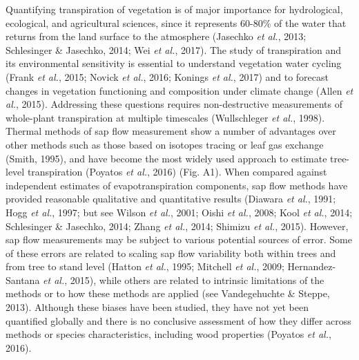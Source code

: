 \documentclass[11pt,twoside]{reedthesis}
\begin{document}
Quantifying transpiration of vegetation is of major importance for
hydrological, ecological, and agricultural sciences, since it represents
60-80\% of the water that returns from the land surface to the
atmosphere (Jasechko \emph{et al.}, 2013; Schlesinger \& Jasechko, 2014;
Wei \emph{et al.}, 2017). The study of transpiration and its
environmental sensitivity is essential to understand vegetation water
cycling (Frank \emph{et al.}, 2015; Novick \emph{et al.}, 2016; Konings
\emph{et al.}, 2017) and to forecast changes in vegetation functioning
and composition under climate change (Allen \emph{et al.}, 2015).
Addressing these questions requires non-destructive measurements of
whole-plant transpiration at multiple timescales (Wullschleger \emph{et
al.}, 1998). Thermal methods of sap flow measurement show a number of
advantages over other methods such as those based on isotopes tracing or
leaf gas exchange (Smith, 1995), and have become the most widely used
approach to estimate tree-level transpiration (Poyatos \emph{et al.},
2016) (Fig. A1). When compared against independent estimates of
evapotranspiration components, sap flow methods have provided reasonable
qualitative and quantitative results (Diawara \emph{et al.}, 1991; Hogg
\emph{et al.}, 1997; but see Wilson \emph{et al.}, 2001; Oishi \emph{et
al.}, 2008; Kool \emph{et al.}, 2014; Schlesinger \& Jasechko, 2014;
Zhang \emph{et al.}, 2014; Shimizu \emph{et al.}, 2015). However, sap
flow measurements may be subject to various potential sources of error.
Some of these errors are related to scaling sap flow variability both
within trees and from tree to stand level (Hatton \emph{et al.}, 1995;
Mitchell \emph{et al.}, 2009; Hernandez-Santana \emph{et al.}, 2015),
while others are related to intrinsic limitations of the methods or to
how these methods are applied (see Vandegehuchte \& Steppe, 2013).
Although these biases have been studied, they have not yet been
quantified globally and there is no conclusive assessment of how they
differ across methods or species characteristics, including wood
properties (Poyatos \emph{et al.}, 2016).\par
\end{document}
